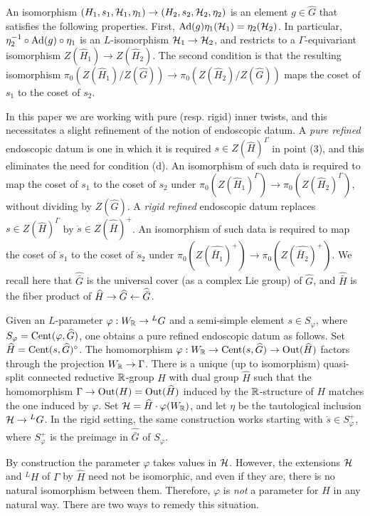 \documentclass{article}
\theoremstyle{definition}
\numberwithin{equation}{section}
\renewcommand{\-}{\hyp{}}
\begin{document}
An isomorphism $(H_1,s_1,\mathcal{H}_1,\eta_1) \to (H_2,s_2,\mathcal{H}_2,\eta_2)$ is an element $g \in \hat G$ that satisfies the following properties. First, $\textrm{Ad}(g)\eta_1(\mathcal{H}_1)=\eta_2(\mathcal{H}_2)$. In particular, $\eta_2^{-1}\circ\textrm{Ad}(g)\circ\eta_1$ is an $L$\-isomorphism $\mathcal{H}_1 \to \mathcal{H}_2$, and restricts to a $\Gamma$-equivariant isomorphism $Z(\hat H_1) \to Z(\hat H_2)$. The second condition is that the resulting isomorphism $\pi_0(Z(\hat H_1)/Z(\hat G)) \to \pi_0(Z(\hat H_2)/Z(\hat G))$ maps the coset of $s_1$ to the coset of $s_2$.

In this paper we are working with pure (resp. rigid) inner twists, and this necessitates a slight refinement of the notion of endoscopic datum. A \emph{pure refined} endoscopic datum is one in which it is required $s \in Z(\hat H)^\Gamma$ in point (3), and this eliminates the need for condition (d). An isomorphism of such data is required to map the coset of $s_1$ to the coset of $s_2$ under $\pi_0(Z(\hat H_1)^\Gamma) \to \pi_0(Z(\hat H_2)^\Gamma)$, without dividing by $Z(\hat G)$. A \emph{rigid refined} endoscopic datum replaces $s \in Z(\hat H)^\Gamma$ by $\dot s \in Z(\hat{\bar H} )^+$. An isomorphism of such data is required to map the coset of $\dot s_1$ to the coset of $\dot s_2$ under $\pi_0(Z(\hat{\bar H_1})^+) \to \pi_0(Z(\hat{ \bar H_2})^+)$. We recall here that $\hat{\bar G}$ is the universal cover (as a complex Lie group) of $\hat G$, and $\hat{\bar H}$ is the fiber product of $\widehat H \to \widehat G \leftarrow \widehat{\bar G}$.

Given an $L$\-parameter $\varphi : W_{\mathbb{R}} \to {^LG}$ and a semi-simple element $s \in S_\varphi$, where $S_\varphi=\textrm{Cent}(\varphi,\widehat G)$, one obtains a pure refined endoscopic datum as follows. Set $\widehat H = \textrm{Cent}(s,\widehat G)^\circ$. The homomorphism  $\varphi : W_{\mathbb{R}} \to \textrm{Cent}(s,\widehat G) \to \textrm{Out}(\widehat H)$ factors through the projection $W_{\mathbb{R}} \to \Gamma$. There is a unique (up to isomorphism) quasi-split connected reductive $\mathbb{R}$-group $H$ with dual group $\hat H$ such that the homomorphism $\Gamma \to \textrm{Out}(H)=\textrm{Out}(\widehat H)$ induced by the $\mathbb{R}$-structure of $H$ matches the one induced by $\varphi$. Set $\mathcal{H}=\widehat H \cdot \varphi(W_{\mathbb{R}})$, and let $\eta$ be the tautological inclusion $\mathcal{H} \to {^LG}$. In the rigid setting, the same construction works starting with $\dot s \in S_\varphi^+$, where $S_\varphi^+$ is the preimage in $\hat{\bar G}$ of $S_\varphi$.

By construction the parameter $\varphi$ takes values in $\mathcal{H}$. However, the extensions $\mathcal{H}$ and $^LH$ of $\Gamma$ by $\hat H$ need not be isomorphic, and even if they are, there is no natural isomorphism between them. Therefore, $\varphi$ is \emph{not} a parameter for $H$ in any natural way. There are two ways to remedy this situation.
\end{document}
